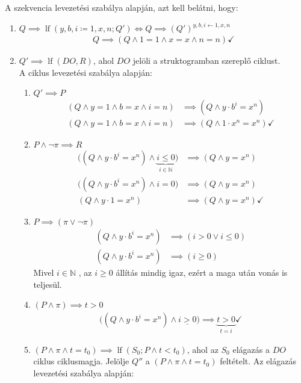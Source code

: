 \documentclass[a4paper,12pt]{article}
\DeclareMathOperator{\lf}{lf}
\begin{document}
	\begin{solution}
		A szekvencia levezetési szabálya alapján, azt kell belátni, hogy:
		\begin{enumerate}
			\item $ Q \implies \lf(y,b,i \coloneq 1,x,n; Q') \iff Q \implies (Q')^{y,b,i \leftarrow 1,x,n} $
			\begin{align*}
				Q \implies ( Q \land 1=1 \land x = x \land n = n ) \checkmark
			\end{align*}
			\item $ Q' \implies \lf(DO, R) $, ahol $DO$ jelöli a struktogramban szereplő ciklust. \\
			A ciklus levezetési szabálya alapján:
			\begin{enumerate}
				\item $Q' \implies P$
				\begin{align*}
					( Q \land y=1 \land b = x \land i = n ) &\implies ( Q \land y \cdot b^i = x^n ) \\
					( Q \land y=1 \land b = x \land i = n ) &\implies ( Q \land 1 \cdot x^n = x^n ) \checkmark
				\end{align*}
				\item $P \land \lnot \pi \implies R$
				\begin{align*}
					\bigr( ( Q \land y \cdot b^i = x^n ) \land \underbrace{ i \le 0 }_{i \in \mathbb{N}} \bigr) &\implies ( Q \land y = x^n ) \\
					\bigr( ( Q \land y \cdot b^i = x^n ) \land i = 0 \bigr) &\implies ( Q \land y = x^n ) \\
					( Q \land y \cdot 1 = x^n ) &\implies ( Q \land y = x^n ) \checkmark
				\end{align*}
				\item $ P \implies (\pi \lor \lnot \pi) $
				\begin{align*}
					( Q \land y \cdot b^i = x^n ) &\implies (i > 0 \lor  i \le 0) \\
					( Q \land y \cdot b^i = x^n ) &\implies (i \ge 0)
				\end{align*}
				Mivel $i \in \mathbb{N} $ , az  $ i \ge 0 $ állítás mindig igaz, ezért a maga után vonás is teljesül.
				\item $ (P \land \pi) \implies t > 0 $
				\begin{align*}
					\bigl( ( Q \land y \cdot b^i = x^n ) \land \underline{i > 0} \bigr) \implies \underbrace{t > 0}_{t=i} \checkmark
				\end{align*}
				\item $ (P \land \pi \land t = t_0) \implies \lf(S_0; P \land  t < t_0) $, ahol az $S_0$ elágazás a $DO$ ciklus ciklusmagja. Jelölje $Q''$ a $ (P \land \pi \land t = t_0) $ feltételt. Az elágazás levezetési szabálya alapján:

\end{enumerate}
\end{enumerate}
\end{solution}
\end{document}
